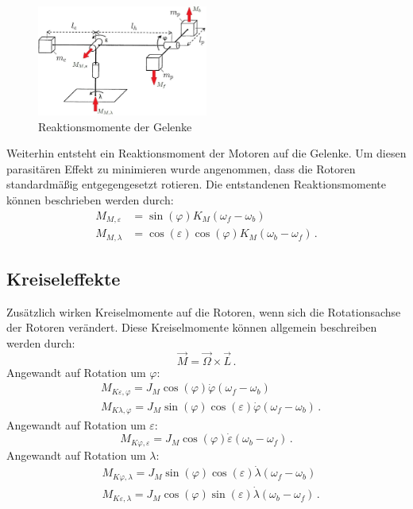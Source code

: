 \documentclass[10pt,twocolumn]{article}
\begin{document}
	\begin{figure}[ht]
	\centering
	\includegraphics[width=0.5\textwidth]{images/setup_mom}
	\caption{Reaktionsmomente der Gelenke}
	\label{setup_mom}
	\end{figure}
	Weiterhin entsteht ein Reaktionsmoment der Motoren auf die Gelenke. Um diesen parasitären Effekt zu minimieren wurde angenommen, dass die Rotoren standardmäßig entgegengesetzt rotieren. Die entstandenen Reaktionsmomente können beschrieben werden durch:
	\begin{subequations}		
	\begin{align}
	M_{M,\varepsilon} &=\sin (\varphi) K_M (\omega_f-\omega_b) \\
	M_{M,\lambda} &=\cos (\varepsilon) \cos (\varphi) K_M (\omega_b-\omega_f)\, .
	\end{align}
\end{subequations}


	\subsection{Kreiseleffekte}

	Zusätzlich wirken Kreiselmomente auf die Rotoren, wenn sich die Rotationsachse der Rotoren verändert. Diese Kreiselmomente können allgemein beschreiben werden durch:
	\begin{equation}
	\vec{M} = \vec{\Omega} \times \vec{L}\, .
	\end{equation}	
	Angewandt auf Rotation um $\varphi$:
	\begin{subequations}
		\begin{align}
		&M_{K\varepsilon,\varphi} = J_M \cos (\varphi) \dot{\varphi}(\omega_f-\omega_b)\\
		&M_{K\lambda,\varphi} = J_M \sin (\varphi) \cos (\varepsilon) \dot{\varphi}(\omega_f-\omega_b)\, .
		\end{align}
	\end{subequations}
	Angewandt auf Rotation um $\varepsilon$:
	\begin{equation}
	M_{K\varphi,\varepsilon} = J_M \cos (\varphi) \dot{\varepsilon}(\omega_b-\omega_f)\, .
	\end{equation}
	Angewandt auf Rotation um $\lambda$:
	\begin{subequations}
		\begin{align}
		&M_{K\varphi,\lambda} = J_M \sin (\varphi) \cos (\varepsilon) \dot{\lambda}(\omega_f-\omega_b)\\
		&M_{K\varepsilon,\lambda} = J_M \cos (\varphi) \sin (\varepsilon) \dot{\lambda}(\omega_b-\omega_f)\, .
		\end{align}
	\end{subequations}
\end{document}
